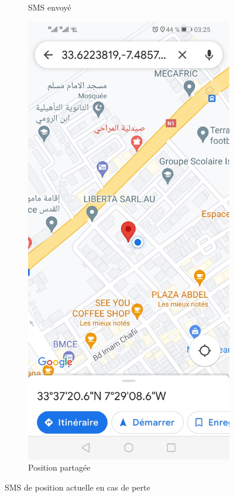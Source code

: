 \begin{figure}[!htbp]
\begin{subfigure}[t]{.45\linewidth}
        \caption{SMS envoyé}
    \end{subfigure}
    \hfill
    \begin{subfigure}[t]{.45\linewidth}
        \centering
         \includegraphics[width=\textwidth]{assets/SMS/location.jpg}
         \caption{Position partagée}
    \end{subfigure}
    \caption{SMS de position actuelle en cas de perte}
\end{figure}

